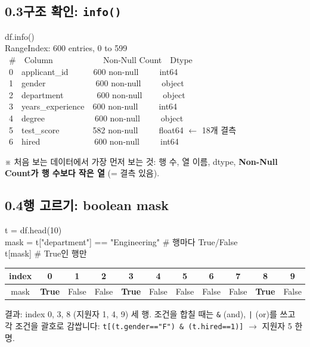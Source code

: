 \documentclass[11pt,a4paper]{article}
\newcommand{\code}[1]{\texttt{#1}}
\newcommand{\aside}[1]{{\footnotesize\color{black!65}#1}}
\begin{document}
\subsection*{0.3\quad 구조 확인: \code{info()}}
\begin{codebox}
df.info()\\[2pt]
RangeIndex: 600 entries, 0 to 599\\
\ \#\ \ Column\ \ \ \ \ \ \ \ \ \ \ \ Non-Null Count\ \ Dtype\\
\ 0\ \ applicant\_id\ \ \ \ \ \ 600 non-null\ \ \ \ \ int64\\
\ 1\ \ gender\ \ \ \ \ \ \ \ \ \ \ \ 600 non-null\ \ \ \ \ object\\
\ 2\ \ department\ \ \ \ \ \ \ \ 600 non-null\ \ \ \ \ object\\
\ 3\ \ years\_experience\ \ 600 non-null\ \ \ \ \ int64\\
\ 4\ \ degree\ \ \ \ \ \ \ \ \ \ \ \ 600 non-null\ \ \ \ \ object\\
\ 5\ \ test\_score\ \ \ \ \ \ \ \ 582 non-null\ \ \ \ \ float64 \hfill $\leftarrow$ 18개 결측\\
\ 6\ \ hired\ \ \ \ \ \ \ \ \ \ \ \ \ 600 non-null\ \ \ \ \ int64
\end{codebox}
\aside{※ 처음 보는 데이터에서 가장 먼저 보는 것: 행 수, 열 이름, dtype, \textbf{Non-Null Count가 행 수보다 작은 열} (= 결측 있음).}

\subsection*{0.4\quad 행 고르기: boolean mask}
\begin{codebox}
t = df.head(10)\\
mask = t["department"] == "Engineering" \hfill \# 행마다 True/False\\
t[mask] \hfill \# True인 행만
\end{codebox}
\begin{center}\small
\begin{tabular}{@{}c c c c c c c c c c c@{}}
\toprule
index & 0 & 1 & 2 & 3 & 4 & 5 & 6 & 7 & 8 & 9 \\
\midrule
mask & \textbf{True} & False & False & \textbf{True} & False & False & False & False & \textbf{True} & False \\
\bottomrule
\end{tabular}
\end{center}
결과: index 0, 3, 8 (지원자 1, 4, 9) 세 행. 조건을 합칠 때는 \code{\&} (and), \code{|} (or)를 쓰고 각 조건을 괄호로 감쌉니다: \code{t[(t.gender=="F") \& (t.hired==1)]} $\to$ 지원자 5 한 명.
\end{document}
